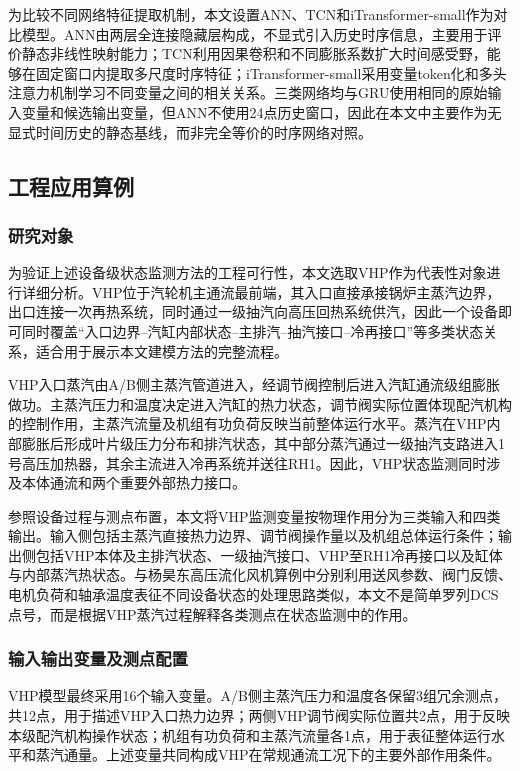 为比较不同网络特征提取机制，本文设置ANN、TCN和iTransformer-small作为对比模型。ANN由两层全连接隐藏层构成，不显式引入历史时序信息，主要用于评价静态非线性映射能力；TCN利用因果卷积和不同膨胀系数扩大时间感受野，能够在固定窗口内提取多尺度时序特征\cite{Bai2018TCN}；iTransformer-small采用变量token化和多头注意力机制学习不同变量之间的相关关系\cite{Liu2024iTransformer}。三类网络均与GRU使用相同的原始输入变量和候选输出变量，但ANN不使用24点历史窗口，因此在本文中主要作为无显式时间历史的静态基线，而非完全等价的时序网络对照。

\subsection{工程应用算例}
\label{subsec:vhp_engineering_case_v3}

\subsubsection{研究对象}

为验证上述设备级状态监测方法的工程可行性，本文选取VHP作为代表性对象进行详细分析。VHP位于汽轮机主通流最前端，其入口直接承接锅炉主蒸汽边界，出口连接一次再热系统，同时通过一级抽汽向高压回热系统供汽，因此一个设备即可同时覆盖“入口边界--汽缸内部状态--主排汽--抽汽接口--冷再接口”等多类状态关系，适合用于展示本文建模方法的完整流程。

VHP入口蒸汽由A/B侧主蒸汽管道进入，经调节阀控制后进入汽缸通流级组膨胀做功。主蒸汽压力和温度决定进入汽缸的热力状态，调节阀实际位置体现配汽机构的控制作用，主蒸汽流量及机组有功负荷反映当前整体运行水平。蒸汽在VHP内部膨胀后形成叶片级压力分布和排汽状态，其中部分蒸汽通过一级抽汽支路进入1号高压加热器，其余主流进入冷再系统并送往RH1。因此，VHP状态监测同时涉及本体通流和两个重要外部热力接口。

参照设备过程与测点布置，本文将VHP监测变量按物理作用分为三类输入和四类输出。输入侧包括主蒸汽直接热力边界、调节阀操作量以及机组总体运行条件；输出侧包括VHP本体及主排汽状态、一级抽汽接口、VHP至RH1冷再接口以及缸体与内部蒸汽热状态。与杨昊东高压流化风机算例中分别利用送风参数、阀门反馈、电机负荷和轴承温度表征不同设备状态的处理思路类似，本文不是简单罗列DCS点号，而是根据VHP蒸汽过程解释各类测点在状态监测中的作用。

\subsubsection{输入输出变量及测点配置}

VHP模型最终采用16个输入变量。A/B侧主蒸汽压力和温度各保留3组冗余测点，共12点，用于描述VHP入口热力边界；两侧VHP调节阀实际位置共2点，用于反映本级配汽机构操作状态；机组有功负荷和主蒸汽流量各1点，用于表征整体运行水平和蒸汽通量。上述变量共同构成VHP在常规通流工况下的主要外部作用条件。

